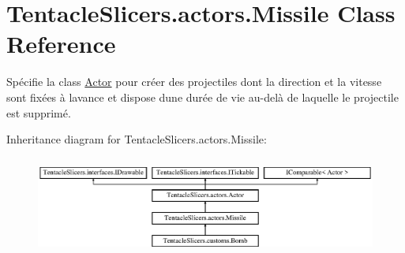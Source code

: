 \hypertarget{class_tentacle_slicers_1_1actors_1_1_missile}{}\section{Tentacle\+Slicers.\+actors.\+Missile Class Reference}
\label{class_tentacle_slicers_1_1actors_1_1_missile}


Spécifie la class \hyperlink{class_tentacle_slicers_1_1actors_1_1_actor}{Actor} pour créer des projectiles dont la direction et la vitesse sont fixées à l\textquotesingle{}avance et dispose d\textquotesingle{}une durée de vie au-\/delà de laquelle le projectile est supprimé.  


Inheritance diagram for Tentacle\+Slicers.\+actors.\+Missile\+:\begin{figure}[H]
\begin{center}
\leavevmode
\includegraphics[height=3.274854cm]{class_tentacle_slicers_1_1actors_1_1_missile}
\end{center}
\end{figure}
